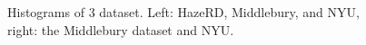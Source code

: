 \begin{figure}[htb]
\centering
{}
\caption{Histograms of 3 dataset. Left: HazeRD, Middlebury, and NYU, right: the Middlebury dataset and NYU.}
\label{fig:3.hist_compare}
\end{figure}

